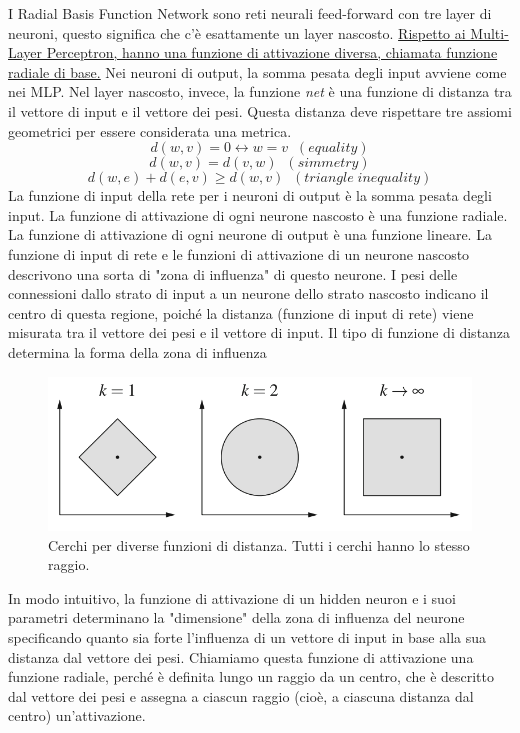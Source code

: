 I Radial Basis Function Network sono reti neurali feed-forward con tre layer di neuroni, questo significa che c'è esattamente un layer nascosto. \uline{Rispetto ai Multi-Layer Perceptron, hanno una funzione di attivazione diversa, chiamata funzione radiale di base.} Nei neuroni di output, la somma pesata degli input avviene come nei MLP. Nel layer nascosto, invece, la funzione \textit{net} è una funzione di distanza tra il vettore di input e il vettore dei pesi. Questa distanza deve rispettare tre assiomi geometrici per essere considerata una metrica.
$$d(w,v) = 0 \leftrightarrow w = v \mathit{\;\;(equality)}$$
$$d(w,v) = d(v,w) \mathit{\;\;(simmetry)}$$
$$d(w,e) + d(e,v) \geq d(w,v) \mathit{\;\;(triangle\;inequality)}$$
La funzione di input della rete per i neuroni di output è la somma pesata degli input.
La funzione di attivazione di ogni neurone nascosto è una funzione radiale.
La funzione di attivazione di ogni neurone di output è una funzione lineare.
La funzione di input di rete e le funzioni di attivazione di un neurone nascosto descrivono una sorta di "zona di influenza" di questo neurone. I pesi delle connessioni dallo strato di input a un neurone dello strato nascosto indicano il centro di questa regione, poiché la distanza (funzione di input di rete) viene misurata tra il vettore dei pesi e il vettore di input. Il tipo di funzione di distanza determina la forma della zona di influenza

\begin{figure}[h]
    \centering
    \includegraphics[scale=0.4]{images/rbfn.png}
    \caption{Cerchi per diverse funzioni di distanza. Tutti i cerchi hanno lo stesso raggio.}
\end{figure}

In modo intuitivo, la funzione di attivazione di un hidden neuron e i suoi parametri determinano la "dimensione" della zona di influenza del neurone specificando quanto sia forte l'influenza di un vettore di input in base alla sua distanza dal vettore dei pesi. Chiamiamo questa funzione di attivazione una funzione radiale, perché è definita lungo un raggio da un centro, che è descritto dal vettore dei pesi e assegna a ciascun raggio (cioè, a ciascuna distanza dal centro) un'attivazione.

